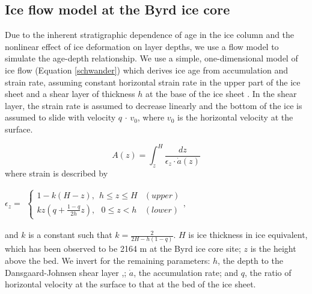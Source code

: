 \subsection{Ice flow model at the Byrd ice core}

Due to the inherent stratigraphic dependence of age in the ice column and the nonlinear effect of ice deformation on layer depths, we use a flow model to simulate the age-depth relationship. We use a simple, one-dimensional model of ice flow (Equation \ref{schwander}) which derives ice age from accumulation and strain rate, assuming constant horizontal strain rate in the upper part of the ice sheet and a shear layer of thickness $h$ at the base of the ice sheet \citep{schwander2001}. In the shear layer, the strain rate is assumed to decrease linearly and the bottom of the ice is assumed to slide with velocity $q$ $\cdot$ $v_0$, where $v_0$ is the horizontal velocity at the surface.

\begin{equation}\label{schwander}
A(z) = \int_{z}^{H} \frac{dz}{\epsilon_z \cdot \dot{a}(z)}
\end{equation}
where strain is described by
\begin{center}
$    \epsilon_z=
	\begin{aligned}
    \begin{cases}
                 1-k(H-z), \:\:  h \leq z \leq H  & (upper) \\
                  kz(q+\frac{1-q}{2h}z), \:\:\: 0 \leq z < h &(lower)
    \end{cases}, 
    \end{aligned}
$

\end{center}
and $k$ is a constant such that $k = \frac{2}{2H - h(1-q)}$. $H$ is ice thickness in ice equivalent, which has been observed to be 2164 m at the Byrd ice core site; $z$ is the height above the bed. We invert for the remaining parameters: $h$, the depth to the Dansgaard-Johnsen shear layer \citep{dansgaardjohnsen1969},; $\dot{a}$, the accumulation rate; and $q$, the ratio of horizontal velocity at the surface to that at the bed of the ice sheet.

